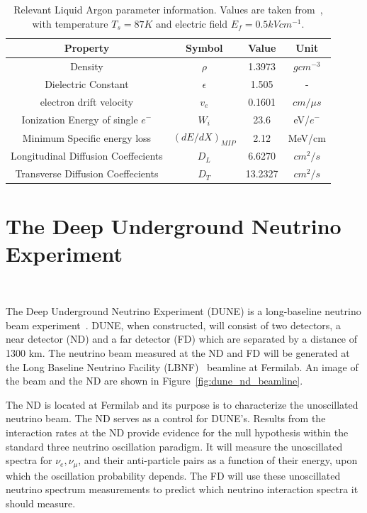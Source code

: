 \begin{table}
  \begin{center}
    \begin{tabular}{||c c c c||}
 \hline
      Property & Symbol & Value & Unit \\
 \hline\hline
      Density & $\rho$ &  1.3973 & $g cm^{-3}$ \\
      Dielectric Constant & $\epsilon$ & 1.505 & - \\
      electron drift velocity & $v_{e}$ & 0.1601 & $\unit{cm/\mu s}$ \\
      Ionization Energy of single $e^{-}$ & $W_{i}$ & 23.6 & eV/$e^{-}$ \\
      Minimum Specific energy loss & $(dE/dX)_{MIP}$ & 2.12 & MeV/cm \\
      Longitudinal Diffusion Coeffecients & $D_{L}$ & 6.6270 & $cm^{2}/s$ \\
      Transverse Diffusion Coeffecients & $D_{T}$ & 13.2327 & $cm^{2}/s$ \\
 \hline
    \end{tabular}
    \caption{
      Relevant Liquid Argon parameter information.
      Values are taken from~\citep{lardata_lbnl}, with temperature $T_{s} = 87 K$ and electric field $E_{f} = 0.5 kV cm^{-1}$.}
  \label{tab:lar_prop}
  \end{center}
\end{table}

\section{The Deep Underground Neutrino Experiment}~\label{sec:dune}

The Deep Underground Neutrino Experiment (DUNE) is a long-baseline neutrino beam experiment~\citep{DUNE_TDR_V1_Abi_2020, DUNE_FD_TDRv2_2020, DUNE_TDRv3_Abi_2020, DUNE-FD_TDRv4:Abi_2020}.
DUNE, when constructed, will consist of two detectors, a near detector (ND) and a far detector (FD) which are separated by a distance of 1300 km.
The neutrino beam measured at the ND and FD will be generated at the Long Baseline Neutrino Facility (LBNF)~\citep{dune_cdr_2016_arxiv} beamline at Fermilab.
An image of the beam and the ND are shown in Figure~\ref{fig:dune_nd_beamline}.

The ND is located at Fermilab and its purpose is to characterize the unoscillated neutrino beam.
The ND serves as a control for DUNE's.
Results from the interaction rates at the ND provide evidence for the null hypothesis within the standard three neutrino oscillation paradigm.
It will measure the unoscillated spectra for $\nu_{e}, \nu_{\mu}$, and their anti-particle pairs as a function of their energy, upon which the oscillation probability depends.
The FD will use these unoscillated neutrino spectrum measurements to predict which neutrino interaction spectra it should measure.

